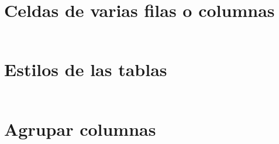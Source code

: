 \begin{frame}[c]{}
\end{frame}

\begin{frame}[fragile]
  \frametitle{}

  \vspace{\baselineskip}
  \begin{lstlisting}

  \end{lstlisting}
\end{frame}

\section{Celdas de varias filas o columnas}

\begin{frame}[c]{}
\end{frame}

\begin{frame}[fragile]
  \frametitle{}

  \vspace{\baselineskip}
  \begin{lstlisting}

  \end{lstlisting}
\end{frame}

\section{Estilos de las tablas}

\begin{frame}[c]{}
\end{frame}

\begin{frame}[fragile]
  \frametitle{}

  \vspace{\baselineskip}
  \begin{lstlisting}

  \end{lstlisting}
\end{frame}

\section{Agrupar columnas}

\begin{frame}[c]{}
\end{frame}

\begin{frame}[fragile]
  \frametitle{}

  \vspace{\baselineskip}
  \begin{lstlisting}

  \end{lstlisting}
\end{frame}

